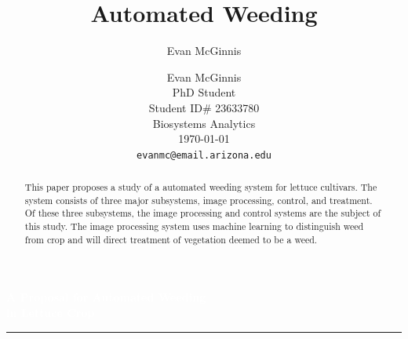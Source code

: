 \documentclass[letterpaper]{article}
\author{Evan McGinnis}
\title{Automated Weeding}
\author{%
    Evan McGinnis \\
    PhD Student \\
    Student ID\#  23633780\\
    Biosystems Analytics \\
    \today \\
    \texttt{evanmc@email.arizona.edu}\vspace{40pt} \\
    }
\makeatletter
\def\printauthor{%
    {\large \@author}}
\makeatother
\begin{document}
\begin{titlepage}
\BgThispage
{}
\vspace*{1cm}
\noindent
\textcolor{white}{\Huge\textbf{\textsf{A Proposal for Automated Weeding\\ in Lettuce Crop}}}
\vspace*{2.5cm}\par
\noindent
\begin{minipage}{0.35\linewidth}
    \begin{flushright}
        \printauthor
    \end{flushright}
\end{minipage} \hspace{15pt}
%
\begin{minipage}{0.02\linewidth}
    \rule{1pt}{175pt}
\end{minipage} \hspace{-10pt}
%
\begin{minipage}{0.6\linewidth}
\vspace{5pt}
    \begin{abstract} 
This paper proposes a study of a automated weeding system for lettuce cultivars.  The system consists of three major subsystems, image processing,  control, and treatment. Of these three subsystems, the image processing and control systems are the subject of this study. The image processing system uses machine learning to distinguish weed from crop and will direct treatment of vegetation deemed to be a weed.
    \end{abstract}
\end{minipage}
\end{titlepage}
\restoregeometry
%
%
\tableofcontents
\listoffigures
\newpage

%
%

%
%
\end{document}
